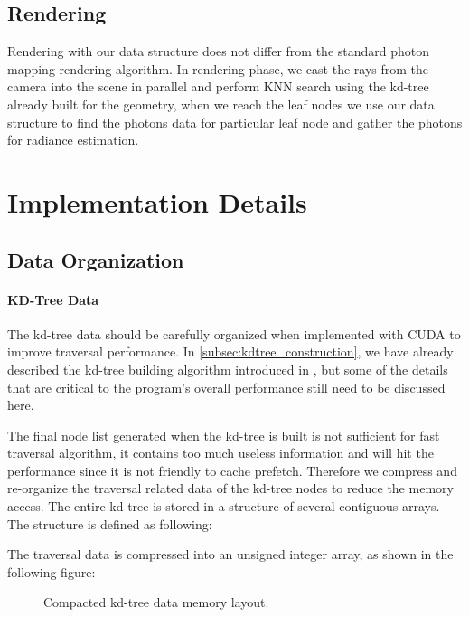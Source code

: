 \subsection{Rendering} 

Rendering with our data structure does not differ from the standard photon mapping rendering algorithm. In rendering phase, we cast the rays from the camera into the scene in parallel and perform KNN search using the kd-tree already built for the geometry, when we reach the leaf nodes we use our data structure to find the photons data for particular leaf node and gather the photons for radiance estimation. 

\section{Implementation Details} 
\label{sec:impl_detials} 

\subsection{Data Organization} 
\label{subsec:data_org}

\paragraph{KD-Tree Data} 

The kd-tree data should be carefully organized when implemented with CUDA to improve traversal performance. In \ref{subsec:kdtree_construction}, we have already described the kd-tree building algorithm introduced in \cite{Zhou2008}, but some of the details that are critical to the program's overall performance still need to be discussed here. 

The final node list generated when the kd-tree is built is not sufficient for fast traversal algorithm, it contains too much useless information and will hit the performance since it is not friendly to cache prefetch. Therefore we compress and re-organize the traversal related data of the kd-tree nodes to reduce the memory access. The entire kd-tree is stored in a structure of several contiguous arrays. The structure is defined as following:  

 

The traversal data is compressed into an unsigned integer array, as shown in the following figure: 

\begin{figure}[htp] 
    \centering 
    \renewcommand{\thefigure}{\thechapter.\arabic{figure}}
    \caption[]{Compacted kd-tree data memory layout.}
    \label{fig:kdtree_data_memory_layout} 
\end{figure}  

